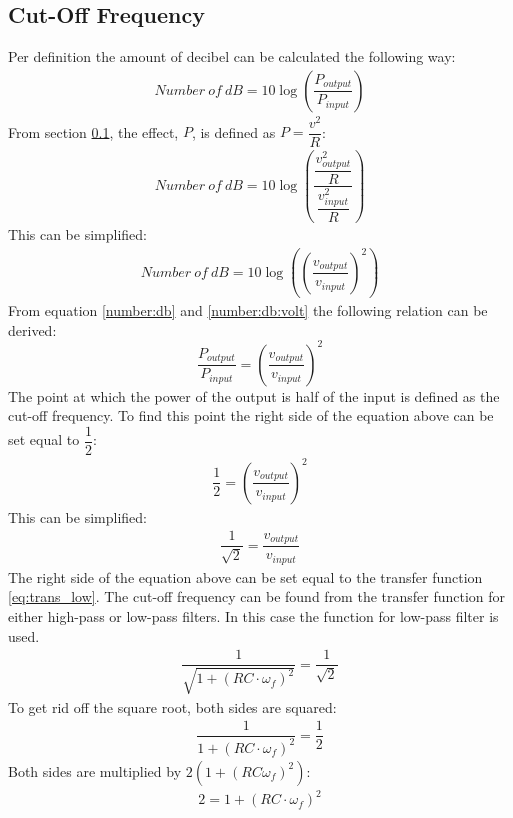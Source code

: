 \subsection{Cut-Off Frequency}
Per definition the amount of decibel can be calculated the following way: \cite[p. 596-597]{bcircuit}
\begin{align} \label{number:db}
Number \ of \ dB = 10 \log \left(\dfrac{P_{output}}{P_{input}} \right)
\end{align}
From section \ref{}, the effect, $P$, is defined as $P=\dfrac{v^2}{R}$:
\begin{align*}
Number \ of \ dB = 10 \log \left(\dfrac{\dfrac{v_{output}^2}{R}}{\dfrac{v_{input}^2}{R}} \right)
\end{align*}
This can be simplified:
\begin{align} \label{number:db:volt}
Number \ of \ dB = 10 \log \left(\left(\dfrac{v_{output}}{v_{input}} \right)^2\right)
\end{align}
From equation \eqref{number:db} and \eqref{number:db:volt} the following relation can be derived:
$$\dfrac{P_{output}}{P_{input}}= \left(\dfrac{v_{output}}{v_{input}} \right)^2$$ 
The point at which the power of the output is half of the input is defined as the cut-off frequency. To find this point the right side of the equation above can be set equal to $\dfrac{1}{2}$:
\begin{align*}
\dfrac{1}{2}= \left(\dfrac{v_{output}}{v_{input}} \right)^2
\end{align*}
This can be simplified:
\begin{align*}
\dfrac{1}{\sqrt{2}}= \dfrac{v_{output}}{v_{input}}
\end{align*}
The right side of the equation above can be set equal to the transfer function \ref{eq:trans_low}. The cut-off frequency can be found from the transfer function for either high-pass or low-pass filters. In this case the function for low-pass filter is used.
\\
\begin{align*}
\dfrac{1}{\sqrt{1+ \left(RC \cdot \omega_f \right)^2}} = \dfrac{1}{\sqrt{2}}
\end{align*}
To get rid off the square root, both sides are squared:
\begin{align*}
\dfrac{1}{1+ \left(RC \cdot \omega_f \right)^2} = \dfrac{1}{2}
\end{align*}
	Both sides are multiplied by $2(1+(RC\omega_f)^2)$:
\begin{align*}
2 = 1+ \left(RC \cdot \omega_f \right)^2
\end{align*}
